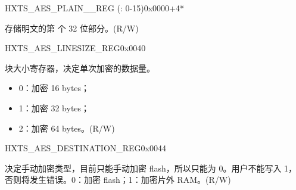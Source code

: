 


\begin{register}{H}{XTS\_AES\_PLAIN\_\_REG (: 0-15)}{0x{}0000+4*}\label{regdesc:XTSAESPLAINNREG}
%
\regnewline%
\begin{regdesc}\begin{reglist}
\label{fielddesc:XTSAESPLAINN}\item [XTS\_AES\_PLAIN\_\regindex{n}] 存储明文的第  个 32 位部分。(R/W)
\end{reglist}\end{regdesc}
\end{register}



\begin{register}{H}{XTS\_AES\_LINESIZE\_REG}{0x{}0040}\label{regdesc:XTSAESLINESIZEREG}
%
%
\regnewline%
\begin{regdesc}\begin{reglist}
\item [XTS\_AES\_LINESIZE] 块大小寄存器，决定单次加密的数据量。
    \begin{itemize}
        \item 0：加密 16 bytes；
        \item 1：加密 32 bytes；
        \item 2：加密 64 bytes。(R/W)
    \end{itemize}
\end{reglist}\end{regdesc}
\end{register}


\begin{register}{H}{XTS\_AES\_DESTINATION\_REG}{0x{}0044}\label{regdesc:XTSAESDESTINATIONREG}
%
%
\regnewline%
\begin{regdesc}\begin{reglist}
\item [XTS\_AES\_DESTINATION] 决定手动加密类型，目前只能手动加密 flash，所以只能为 0。用户不能写入 1，否则将发生错误。0：加密 flash；1：加密片外 RAM。(R/W)

\end{reglist}\end{regdesc}
\end{register}


